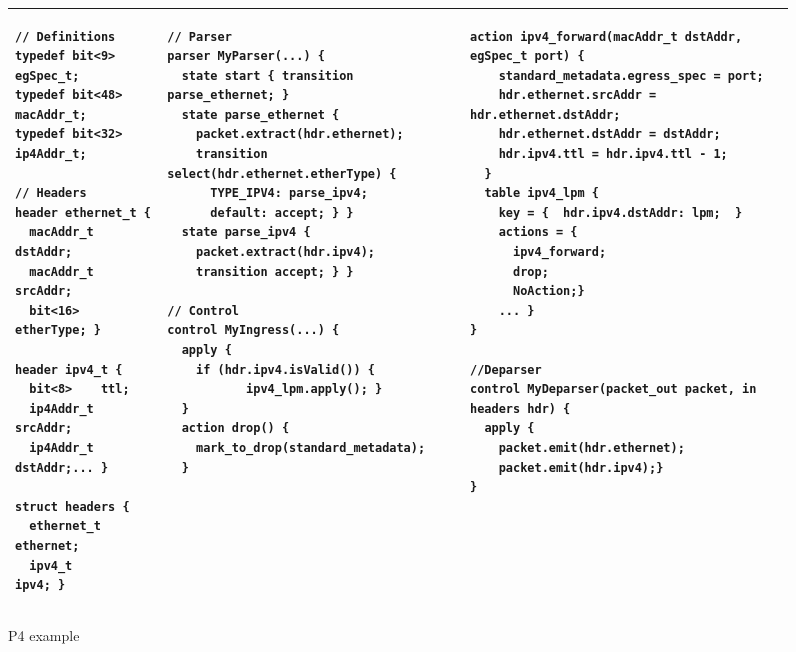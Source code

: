 \documentclass[sigconf]{acmart}
\begin{document}
\begin{figure}
\begin{tabular}{|p{3.3cm}|p{5.9cm}|p{7.7cm}|}
\hline
\begin{lstlisting}[language=P4]
// Definitions
typedef bit<9>  egSpec_t;
typedef bit<48> macAddr_t;
typedef bit<32> ip4Addr_t;

// Headers
header ethernet_t {
  macAddr_t dstAddr;
  macAddr_t srcAddr;
  bit<16>   etherType; }
    
header ipv4_t {
  bit<8>    ttl;
  ip4Addr_t srcAddr;
  ip4Addr_t dstAddr;... }
    
struct headers {
  ethernet_t   ethernet;
  ipv4_t       ipv4; }

\end{lstlisting}
&
\begin{lstlisting}[language=P4]
// Parser
parser MyParser(...) {
  state start { transition parse_ethernet; }
  state parse_ethernet {
    packet.extract(hdr.ethernet);
    transition select(hdr.ethernet.etherType) {
      TYPE_IPV4: parse_ipv4;
      default: accept; } }
  state parse_ipv4 {
    packet.extract(hdr.ipv4);
    transition accept; } }
    
// Control    
control MyIngress(...) {
  apply {
    if (hdr.ipv4.isValid()) {
           ipv4_lpm.apply(); }
  }         
  action drop() {
    mark_to_drop(standard_metadata);
  }    
\end{lstlisting}
&
\begin{lstlisting}[language=P4]
  action ipv4_forward(macAddr_t dstAddr, egSpec_t port) {
    standard_metadata.egress_spec = port;
    hdr.ethernet.srcAddr = hdr.ethernet.dstAddr;
    hdr.ethernet.dstAddr = dstAddr;
    hdr.ipv4.ttl = hdr.ipv4.ttl - 1;
  }    
  table ipv4_lpm {
    key = {  hdr.ipv4.dstAddr: lpm;  }
    actions = {
      ipv4_forward;
      drop;
      NoAction;}
    ... }   
}

//Deparser
control MyDeparser(packet_out packet, in headers hdr) {
  apply {
    packet.emit(hdr.ethernet);
    packet.emit(hdr.ipv4);}
}
\end{lstlisting}\\
\hline
\end{tabular}
\caption{P4 example}
  \label{code:P4}
\end{figure}



\end{document}
